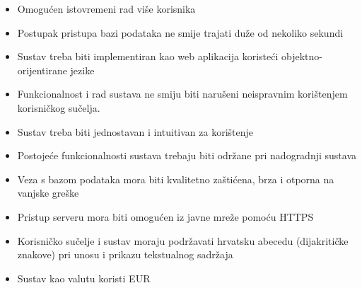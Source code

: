 			\begin{itemize}
                \item Omogućen istovremeni rad više korisnika
                \item Postupak pristupa bazi podataka ne smije trajati duže od nekoliko sekundi
                \item Sustav treba biti implementiran kao web aplikacija koristeći objektno-orijentirane jezike
                \item Funkcionalnost i rad sustava ne smiju biti narušeni neispravnim korištenjem korisničkog sučelja. 
                \item Sustav treba biti jednostavan i intuitivan za korištenje
                \item Postojeće funkcionalnosti sustava trebaju biti održane pri nadogradnji sustava
                \item Veza s bazom podataka mora biti kvalitetno zaštićena, brza i otporna na vanjske greške
                \item Pristup serveru mora biti omogućen iz javne mreže pomoću HTTPS
                \item Korisničko sučelje i sustav moraju podržavati hrvatsku abecedu (dijakritičke znakove) pri unosu i prikazu tekstualnog sadržaja
                \item Sustav kao valutu koristi EUR
            \end{itemize}
			 
			 
		